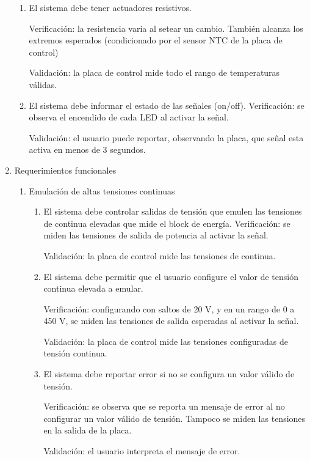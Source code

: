 \documentclass[
11pt, %
codirector, %
]{charter}
\begin{document}
\begin{enumerate}
\begin{enumerate}
		      \item El sistema debe tener actuadores resistivos.

		            Verificación: la resistencia varia al setear un cambio. También alcanza los extremos esperados
		            (condicionado por el sensor NTC de la placa de control)

		            Validación: la placa de control mide todo el rango de temperaturas válidas.

		      \item El sistema debe informar el estado de las señales (on/off).
		            Verificación: se observa el encendido de cada LED al activar la señal.

		            Validación: el usuario puede reportar, observando la placa, que señal esta activa en menos de 3 segundos.
	      \end{enumerate}
	\item Requerimientos funcionales
	      \begin{enumerate}
		      \item Emulación de altas tensiones continuas
		            \begin{enumerate}
			            \item El sistema debe controlar salidas de tensión que emulen las tensiones de continua elevadas que mide el block de energía.
			                  Verificación: se miden las tensiones de salida de potencia al activar la señal.

			                  Validación: la placa de control mide las tensiones de continua.
			            \item El sistema debe permitir que el usuario configure el valor de tensión continua elevada a emular.

			                  Verificación: configurando con saltos de 20 V, y en un rango de 0 a 450 V, se miden las tensiones de salida esperadas al activar la señal.

			                  Validación: la placa de control mide las tensiones configuradas de tensión continua.

			            \item El sistema debe reportar error si no se configura un valor válido de tensión.

			                  Verificación: se observa que se reporta un mensaje de error al no configurar un valor válido de tensión. Tampoco se miden las tensiones en la salida de la placa.

			                  Validación: el usuario interpreta el mensaje de error.


\end{enumerate}
\end{enumerate}
\end{enumerate}
\end{document}
